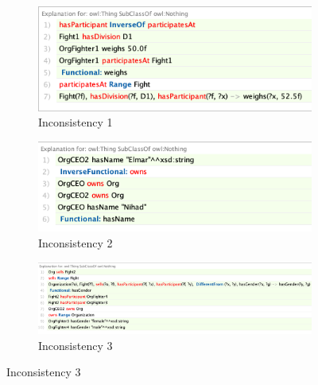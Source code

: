 \documentclass[a4paper]{article}
\begin{document}
\begin{figure}[H]
\centering
\begin{subfigure}{.3\textwidth}
	\centering
	\includegraphics[width=.9\linewidth]{resources/incons1.png}
	\caption{Inconsistency 1}
	\label{fig:sub11}
\end{subfigure}%
\begin{subfigure}{.3\textwidth}
	\centering
	\includegraphics[width=.9\linewidth]{resources/incons2.png}
	\caption{Inconsistency 2}
	\label{fig:sub12}
\end{subfigure}%
\begin{subfigure}{.3\textwidth}
	\centering
	\includegraphics[width=.9\linewidth]{resources/incons3.png}
	\caption{Inconsistency 3}
	\label{fig:sub13}
\end{subfigure}


\end{figure}
\end{document}
